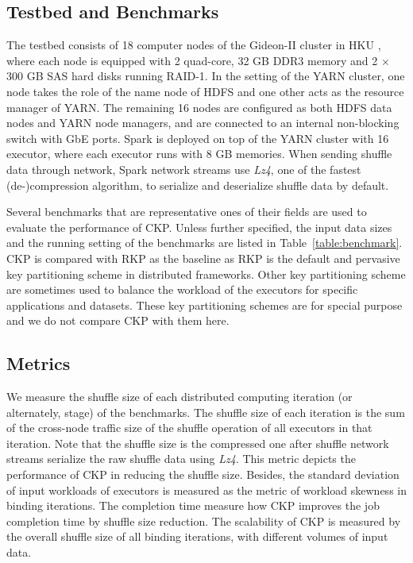 \documentclass[10pt,journal,compsoc]{IEEEtran}
\begin{document}
\subsection{Testbed and Benchmarks}
The testbed consists of 18 computer nodes of the Gideon-II cluster in
HKU \cite{gideon}, where each node is equipped with 2 quad-core, 32 GB
DDR3 memory and 2 $\times$ 300 GB SAS hard disks running RAID-1.
In the setting of the YARN cluster, one node takes the role of  the name
node of HDFS and one other acts as the resource manager of YARN. The
remaining 16 nodes are configured as both HDFS data nodes and YARN node
managers, and are connected to an internal non-blocking switch with GbE
ports.
Spark is deployed on top of the YARN cluster with 16 executor, where each executor runs with 8 GB memories. 
When sending shuffle data through network, Spark network streams use 
\emph{Lz4}, one of the fastest (de-)compression algorithm, to serialize and deserialize shuffle 
data by default. 


Several benchmarks that are representative ones of their fields are used to evaluate the performance of CKP.
Unless further specified, the input data sizes and the running setting of the benchmarks are listed in Table~\ref{table:benchmark}.
CKP is compared with RKP as the baseline as RKP is the default and pervasive key partitioning scheme in distributed frameworks. 
Other key partitioning scheme are sometimes used to balance the workload of the executors for specific applications and datasets. 
These key partitioning schemes are for special purpose and we do not compare CKP with them here. 

\subsection{Metrics}
We measure the shuffle size of each distributed computing iteration (or alternately, stage) of the benchmarks. 
The shuffle size of each iteration is the sum of the cross-node traffic size of the shuffle operation of all executors in that iteration. 
Note that the shuffle size is the compressed one after shuffle network streams serialize the raw shuffle data using \emph{Lz4}. 
This metric depicts the performance of CKP in reducing the shuffle size. 
Besides, the standard deviation of input workloads of executors is measured as the metric of workload skewness in binding iterations. 
The completion time measure how CKP improves the job completion time by shuffle 
size reduction.
The scalability of CKP is measured by the overall shuffle size of all binding iterations, with different volumes of input data. 
\end{document}
